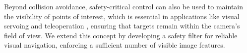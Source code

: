 Beyond collision avoidance, safety-critical control can also be used to maintain the visibility of points of interest, which is essential in applications like visual servoing \cite{zheng2019toward} \cite{wei2024diffocclusion} and teleoperation \cite{kim2023visibility}, ensuring that targets remain within the camera's field of view. We extend this concept by developing a safety filter for reliable visual navigation, enforcing a sufficient number of visible image features.





%